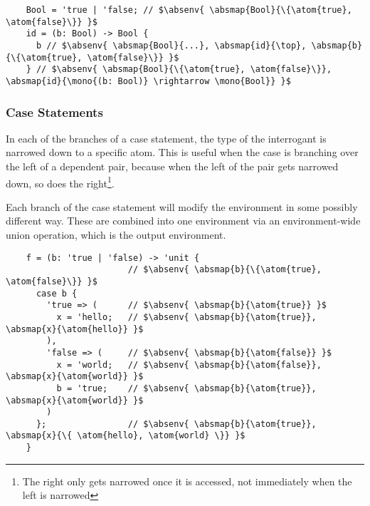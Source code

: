 \documentclass[12pt,twoside]{report}
\begin{document}
\begin{listing}[H]
  \begin{verbatim}
    Bool = 'true | 'false; // $\absenv{ \absmap{Bool}{\{\atom{true}, \atom{false}\}} }$
    id = (b: Bool) -> Bool {
      b // $\absenv{ \absmap{Bool}{...}, \absmap{id}{\top}, \absmap{b}{\{\atom{true}, \atom{false}\}} }$
    } // $\absenv{ \absmap{Bool}{\{\atom{true}, \atom{false}\}}, \absmap{id}{\mono{(b: Bool)} \rightarrow \mono{Bool}} }$
  \end{verbatim}
  \caption{While type checking the body, argument  is in the abstract environment. Abstractly the function is two pieces of \textit{syntax}:  and  instead of their respective types which are both $\{\atom{true}, \atom{false}\}$}
\end{listing}



\subsubsection{Case Statements}
In each of the branches of a case statement, the type of the interrogant is narrowed down to a specific atom. This is useful when the case is branching over the left of a dependent pair, because when the left of the pair gets narrowed down, so does the right\footnote{The right only gets narrowed once it is accessed, not immediately when the left is narrowed}.

Each branch of the case statement will modify the environment in some possibly different way. These are combined into one environment via an environment-wide union operation, which is the output environment.

\begin{listing}[H]
  \begin{verbatim}
    f = (b: 'true | 'false) -> 'unit {
                        // $\absenv{ \absmap{b}{\{\atom{true}, \atom{false}\}} }$
      case b {
        'true => (      // $\absenv{ \absmap{b}{\atom{true}} }$
          x = 'hello;   // $\absenv{ \absmap{b}{\atom{true}}, \absmap{x}{\atom{hello}} }$
        ),
        'false => (     // $\absenv{ \absmap{b}{\atom{false}} }$
          x = 'world;   // $\absenv{ \absmap{b}{\atom{false}}, \absmap{x}{\atom{world}} }$
          b = 'true;    // $\absenv{ \absmap{b}{\atom{true}}, \absmap{x}{\atom{world}} }$ 
        )
      };                // $\absenv{ \absmap{b}{\atom{true}}, \absmap{x}{\{ \atom{hello}, \atom{world} \}} }$
    }
  \end{verbatim}
  \caption{Each branch of the case statement is abstractly interpreted with  narrowed down to a single atom (lines 4 and 7). Both branches modify , but to different values which make their environments different (lines 5 and 8); these different values are unioned together in the final environment to $\{\atom{hello}, \atom{world}\}$. The false branch happens to mutate  back to $\atom{true}$, which means by the end of \textit{both} branches, $b: \atom{true}$, which is reflected in the final environment which maps  to $\atom{true}$ instead of $\{\atom{true}, \atom{false}\}$.}
\end{listing}
\end{document}
